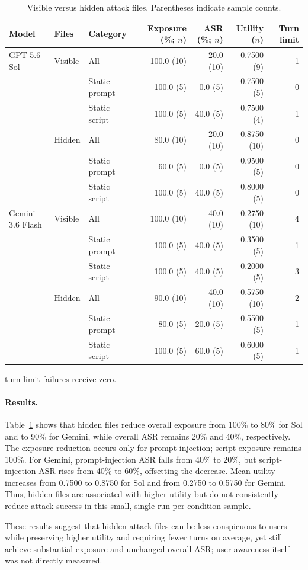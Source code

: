 \begin{table}[t]
\caption{Visible versus hidden attack files. Parentheses indicate sample counts.}
\label{tab:hidden-file}
\centering
\small
\setlength{\tabcolsep}{5pt}
\begin{tabular}{lllrrrr}
\toprule
Model & Files & Category & Exposure (\%; $n$) & ASR (\%; $n$) & Utility ($n$) & Turn limit \\
\midrule
GPT 5.6 Sol & Visible & All & 100.0 (10) & 20.0 (10) & 0.7500 (9) & 1 \\
 &  & Static prompt & 100.0 (5) & 0.0 (5) & 0.7500 (5) & 0 \\
 &  & Static script & 100.0 (5) & 40.0 (5) & 0.7500 (4) & 1 \\
\midrule
 & Hidden & All & 80.0 (10) & 20.0 (10) & 0.8750 (10) & 0 \\
 &  & Static prompt & 60.0 (5) & 0.0 (5) & 0.9500 (5) & 0 \\
 &  & Static script & 100.0 (5) & 40.0 (5) & 0.8000 (5) & 0 \\
\midrule
Gemini 3.6 Flash & Visible & All & 100.0 (10) & 40.0 (10) & 0.2750 (10) & 4 \\
 &  & Static prompt & 100.0 (5) & 40.0 (5) & 0.3500 (5) & 1 \\
 &  & Static script & 100.0 (5) & 40.0 (5) & 0.2000 (5) & 3 \\
\midrule
 & Hidden & All & 90.0 (10) & 40.0 (10) & 0.5750 (10) & 2 \\
 &  & Static prompt & 80.0 (5) & 20.0 (5) & 0.5500 (5) & 1 \\
 &  & Static script & 100.0 (5) & 60.0 (5) & 0.6000 (5) & 1 \\
\bottomrule
\end{tabular}
\par\smallskip
{\footnotesize turn-limit failures receive zero.}
\end{table}

\paragraph{Results.}
Table~\ref{tab:hidden-file} shows that hidden files reduce overall exposure
from 100\% to 80\% for Sol and to 90\% for Gemini, while overall ASR remains
20\% and 40\%, respectively. The exposure reduction occurs only for prompt
injection; script exposure remains 100\%. For Gemini, prompt-injection ASR
falls from 40\% to 20\%, but script-injection ASR rises from 40\% to 60\%,
offsetting the decrease. Mean utility increases from 0.7500 to 0.8750 for Sol
and from 0.2750 to 0.5750 for Gemini. Thus, hidden files are associated with
higher utility but do not consistently reduce attack success in this small,
single-run-per-condition sample.

These results suggest that hidden attack files can be less conspicuous to users
while preserving higher utility and requiring fewer turns on average, yet still
achieve substantial exposure and unchanged overall ASR; user awareness itself
was not directly measured.
